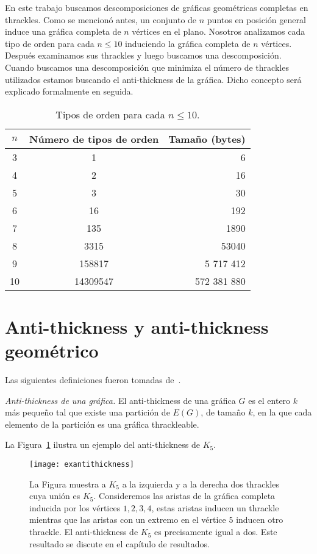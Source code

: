En este trabajo buscamos descomposiciones de gráficas geométricas completas en
thrackles. Como se mencionó antes, un conjunto de $n$ puntos en posición general
induce una gráfica completa de $n$ vértices en el plano. Nosotros analizamos
cada tipo de orden para cada $n\leq 10$ induciendo la gráfica completa de $n$
vértices. Después examinamos sus thrackles y luego buscamos una descomposición.
Cuando buscamos una descomposición que minimiza el número de thrackles
utilizados estamos buscando el anti-thickness de la gráfica. Dicho concepto
será explicado formalmente en seguida.
\begin{table}[ht]
  \centering
  \begin{tabular}{|c|c|r|}
  \hline
  $n$ & Número de tipos de orden & Tamaño (bytes)   \\ \hline
  3     & 1                   & 6       \\ \hline
  4     & 2                   & 16      \\ \hline
  5     & 3                   & 30      \\ \hline
  6     & 16                  & 192     \\ \hline
  7     & 135                 & 1890    \\ \hline
  8     & 3315                & 53040   \\ \hline
  9     & 158817              &	5 717 412   \\\hline
  10    & 14309547            & 572 381 880 \\ \hline
  \end{tabular}
  \caption{Tipos de orden para cada $n\leq10$.}
  \label{tab:ots}
\end{table}

\section{Anti-thickness y anti-thickness geométrico} \label{secc:anti-thickness}
Las siguientes definiciones fueron tomadas de~\cite{Dujmovic2017}.
\begin{definition}{\emph{Anti-thickness de una gráfica.}}
  El anti-thickness de una gráfica $G$ es el entero $k$ más pequeño tal que
  existe una partición de $E(G)$, de tamaño $k$, en la que cada elemento de la
  partición es una gráfica thrackleable.
\end{definition}
La Figura~\ref{fig:exantithickness} ilustra un ejemplo del anti-thickness de
$K_5$.
\begin{figure}[htpb]
  \centering
  \texttt{[image: exantithickness]}
  \caption{La Figura muestra a $K_5$ a la izquierda y a la derecha dos thrackles
  cuya unión es $K_5$. Consideremos las aristas de la gráfica completa inducida por los vértices $1,2,3,4$,
  estas aristas inducen un thrackle mientras que las aristas con un extremo en el vértice $5$ inducen otro thrackle.
  El anti-thickness de $K_5$ es precisamente igual a dos. Este resultado se discute en el capítulo de resultados.}
  \label{fig:exantithickness}
\end{figure}

